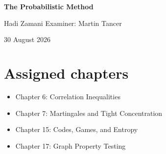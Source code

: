 \documentclass[10pt]{article}
\newcommand{\1}{\mathbf 1}
\begin{document}
\begin{center}
{\LARGE\bfseries The Probabilistic Method\par}
\vspace{1mm}
{Hadi Zamani \qquad Examiner: Martin Tancer\par}
{\small 30 August 2026}
\end{center}

\section*{Assigned chapters}
\begin{itemize}
\item Chapter 6: Correlation Inequalities
\item Chapter 7: Martingales and Tight Concentration
\item Chapter 15: Codes, Games, and Entropy
\item Chapter 17: Graph Property Testing
\end{itemize}
\end{document}

